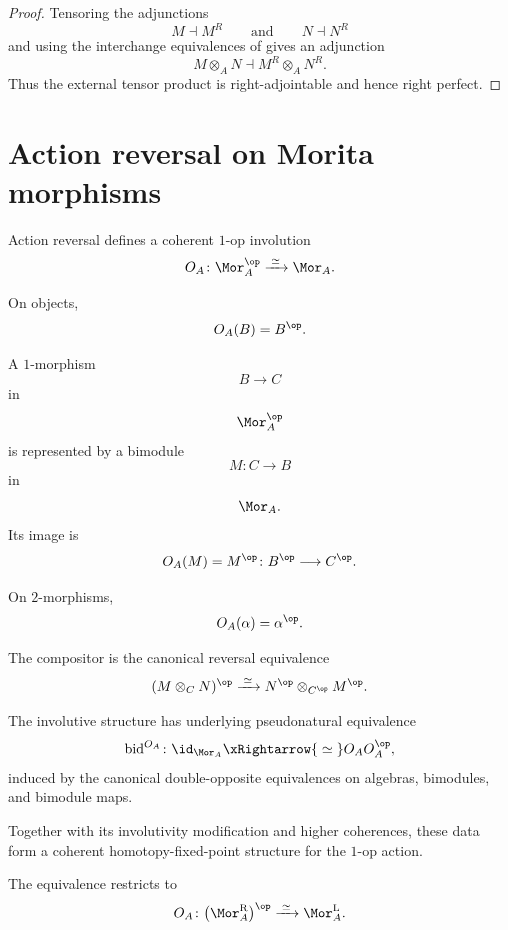 \begin{proof}
Tensoring the adjunctions
\[
    M\dashv M^R
    \qquad\text{and}\qquad
    N\dashv N^R
\]
and using the interchange equivalences of
gives an adjunction
\[
    M\otimes_A N
    \dashv
    M^R\otimes_A N^R.
\]
Thus the external tensor product is right-adjointable and hence right
perfect.
\end{proof}

\section{Action reversal on Morita morphisms}
\label{sec:action-reversal-adjointable-morita}

\begin{proposition}
\label{prop:action-reversal-equivalence}
Action reversal defines a coherent $1$-op involution
\[
    O_A
    \colon
    \Mor_A^{\op}
    \xrightarrow{\;\simeq\;}
    \Mor_A.
\]

On objects,
\[
    O_A(B)
    =
    B^{\op}.
\]

A $1$-morphism
\[
    B
    \longrightarrow
    C
\]
in
\[
    \Mor_A^{\op}
\]
is represented by a bimodule
\[
    M
    \colon
    C
    \longrightarrow
    B
\]
in
\[
    \Mor_A.
\]
Its image is
\[
    O_A(M)
    =
    M^{\op}
    \colon
    B^{\op}
    \longrightarrow
    C^{\op}.
\]

On $2$-morphisms,
\[
    O_A(\alpha)
    =
    \alpha^{\op}.
\]

The compositor is the canonical reversal equivalence
\[
    (M\otimes_C N)^{\op}
    \xrightarrow{\;\simeq\;}
    N^{\op}
    \otimes_{C^{\op}}
    M^{\op}.
\]

The involutive structure has underlying pseudonatural equivalence
\[
    \operatorname{bid}^{O_A}
    \colon
    \id_{\Mor_A}
    \xRightarrow{\;\simeq\;}
    O_A O_A^{\op},
\]
induced by the canonical double-opposite equivalences on algebras,
bimodules, and bimodule maps.

Together with its involutivity modification and higher coherences, these
data form a coherent homotopy-fixed-point structure for the
$1$-op action.

The equivalence restricts to
\[
    O_A
    \colon
    \bigl(
        \Mor_A^{\mathrm R}
    \bigr)^{\op}
    \xrightarrow{\;\simeq\;}
    \Mor_A^{\mathrm L}.
\]
\end{proposition}

